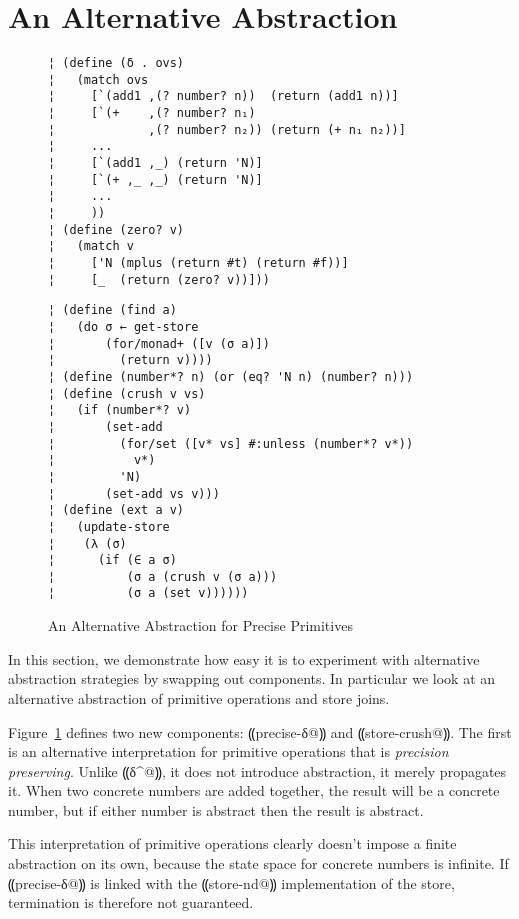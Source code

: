 \section{An Alternative Abstraction}\label{s:alt-abstraction}

\begin{figure} %
\begin{lstlisting}
¦ (define (δ . ovs)
¦   (match ovs
¦     [`(add1 ,(? number? n))  (return (add1 n))]
¦     [`(+    ,(? number? n₁)
¦             ,(? number? n₂)) (return (+ n₁ n₂))]
¦     ...
¦     [`(add1 ,_) (return 'N)]
¦     [`(+ ,_ ,_) (return 'N)]
¦     ...
¦     ))
¦ (define (zero? v)
¦   (match v
¦     ['N (mplus (return #t) (return #f))]
¦     [_  (return (zero? v))]))
\end{lstlisting}
\figskip{}
\begin{lstlisting}
¦ (define (find a)
¦   (do σ ← get-store
¦       (for/monad+ ([v (σ a)])
¦         (return v))))
¦ (define (number*? n) (or (eq? 'N n) (number? n)))
¦ (define (crush v vs)
¦   (if (number*? v)
¦       (set-add 
¦         (for/set ([v* vs] #:unless (number*? v*)) 
¦           v*) 
¦         'N)
¦       (set-add vs v)))
¦ (define (ext a v)
¦   (update-store
¦    (λ (σ)
¦      (if (∈ a σ)
¦          (σ a (crush v (σ a)))
¦          (σ a (set v))))))
\end{lstlisting}
\caption{An Alternative Abstraction for Precise Primitives}
\label{f:pres-delta}
\end{figure} %

In this section, we demonstrate how easy it is to experiment with alternative
abstraction strategies by swapping out components.  In particular we look at an
alternative abstraction of primitive operations and store joins.

Figure~\ref{f:pres-delta} defines two new components: ⸨precise-δ@⸩ and
⸨store-crush@⸩.  The first is an alternative interpretation for primitive
operations that is \emph{precision preserving}.  Unlike ⸨δ^@⸩, it does not
introduce abstraction, it merely propagates it.  When two concrete
numbers are added together, the result will be a concrete number, but if either
number is abstract then the result is abstract.

This interpretation of primitive operations clearly doesn't impose a finite
abstraction on its own, because the state space for concrete numbers is
infinite. If ⸨precise-δ@⸩ is linked with the ⸨store-nd@⸩ implementation of the
store, termination is therefore not guaranteed.  

